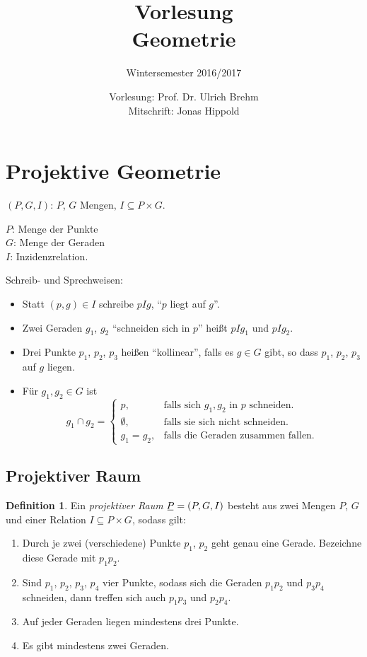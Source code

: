 \documentclass[
 a4paper,
 12pt,
 parskip=half
 ]{scrartcl}
\title{Vorlesung\\Geometrie}
\subtitle{Wintersemester 2016/2017}
\author{Vorlesung: Prof. Dr. Ulrich Brehm\\Mitschrift: Jonas Hippold}
\theoremstyle{plain}
\theoremstyle{definition}
\newtheorem*{defn*}{Definition}
\begin{document}
\maketitle

\tableofcontents

\clearpage

\setcounter{secnumdepth}{0}
% 

\clearpage


\clearpage
\setcounter{secnumdepth}{1}
\section{Projektive Geometrie}
\setcounter{secnumdepth}{0}
$(P,G,I)$: $P$, $G$ Mengen, $I \subseteq P \times G$.

$P$: Menge der Punkte \\
$G$: Menge der Geraden \\
$I$: Inzidenzrelation.

Schreib- und Sprechweisen:
\begin{itemize}
 \item Statt $(p,g) \in I$ schreibe $pIg$, ``$p$ liegt auf $g$''. 
 \item Zwei Geraden $g_1$, $g_2$ ``schneiden sich in $p$'' heißt $pIg_1$ und $pIg_2$. 
 \item Drei Punkte $p_1$, $p_2$, $p_3$ heißen ``kollinear'', falls es $g \in G$ gibt, so dass $p_1$, $p_2$, $p_3$ auf $g$ liegen.
 \item Für $g_1, g_2 \in G$ ist
  \[ g_1 \cap g_2 = \begin{cases}
                   p, &\text{falls sich } g_1, g_2 \text{ in } p \text{ schneiden.} \\
                   \emptyset, &\text{falls sie sich nicht schneiden.} \\
                   g_1 = g_2, &\text{falls die Geraden zusammen fallen.}
                  \end{cases} \]
\end{itemize}

\subsection{Projektiver Raum}
\begin{defn*}\label{def:proj}
 Ein \emph{projektiver Raum} $\proj = (P,G,I)$ besteht aus zwei Mengen $P$, $G$ und einer Relation $I \subseteq P \times G$, sodass gilt:
 \begin{enumerate}[\hspace{.5cm}{A}1)]
  \item Durch je zwei (verschiedene) Punkte $p_1$, $p_2$ geht genau eine Gerade. Bezeichne diese Gerade mit $p_1 p_2$.
  \item Sind $p_1$, $p_2$, $p_3$, $p_4$ vier Punkte, sodass sich die Geraden $p_1 p_2$ und $p_3 p_4$ schneiden, dann treffen sich auch $p_1 p_3$ und $p_2 p_4$.
  \item Auf jeder Geraden liegen mindestens drei Punkte.
  \item Es gibt mindestens zwei Geraden.
 \end{enumerate}
\end{defn*}
\end{document}
